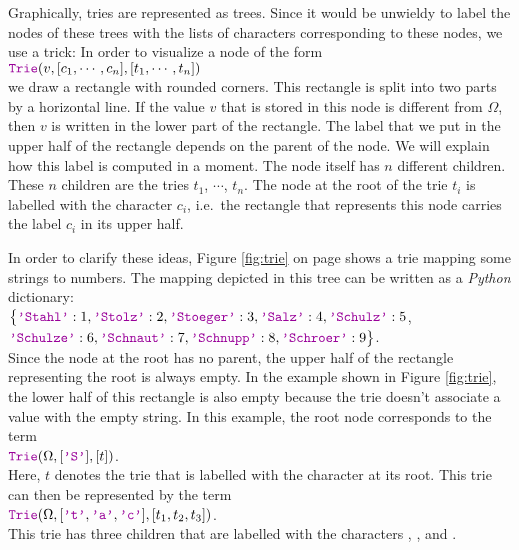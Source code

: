 Graphically, tries are represented as trees.  Since it would be unwieldy to label the nodes of these
trees with the lists of characters corresponding to these nodes, we use a trick:  In order to
visualize a node of the form \\[0.2cm]
\hspace*{1.3cm} 
$\mytt{Trie}(v, [c_1, \cdots, c_n], [t_1, \cdots, t_n])$ \\[0.2cm]
we draw a rectangle with rounded corners.  This rectangle is split into two parts by a horizontal line.
If the value  $v$ that is stored in this node is different from $\Omega$, then $v$ is
written in the lower part of the rectangle.  The label that we put in the upper half of the rectangle
depends on the parent of the node.  We will explain how this label is computed in a moment.
The node itself has $n$ different children.  These $n$ children are the tries
$t_1$, $\cdots$, $t_n$.  The node at the root of the trie $t_i$ is labelled with the character $c_i$,
i.e.~the rectangle that represents this node carries the label $c_i$ in its upper half.

In order to clarify these ideas, Figure  \ref{fig:trie} on page \pageref{fig:trie} shows a trie
mapping some strings to numbers.  The mapping depicted in this tree can be written as a \textsl{Python}
dictionary: 
\\[0.2cm]
\hspace*{1.3cm} $ \bigl\{ \mytt{'Stahl'}: 1, \mytt{'Stolz'}: 2, \mytt{'Stoeger'}: 3, \mytt{'Salz'}: 4, \mytt{'Schulz'}: 5$, \\[0.2cm]
\hspace*{1.5cm} $         \mytt{'Schulze'}: 6, \mytt{'Schnaut'}: 7, \mytt{'Schnupp'}: 8, \mytt{'Schroer'}: 9\bigr\}$. \\[0.2cm]
Since the node at the root has no parent, the upper half of  the rectangle representing the root is
always empty.  In the example shown in Figure \ref{fig:trie}, the lower half of this rectangle is also empty
because the trie doesn't associate a value with the empty string.  In this example, the root node corresponds
to the term  
\\[0.2cm]
\hspace*{1.3cm}
 $\mytt{Trie}(\Omega,[\mytt{'S'}], [t])$. 
\\[0.2cm]
Here,  $t$ denotes the trie that is labelled with the character   at its root.
This trie can then be represented by the term  \\[0.2cm]
\hspace*{1.3cm} 
$\mytt{Trie}(\Omega,[\mytt{'t'},\mytt{'a'},\mytt{'c'}], [t_1, t_2, t_3])$. \\[0.2cm]
This trie has three children that are labelled with the characters  , , and .

